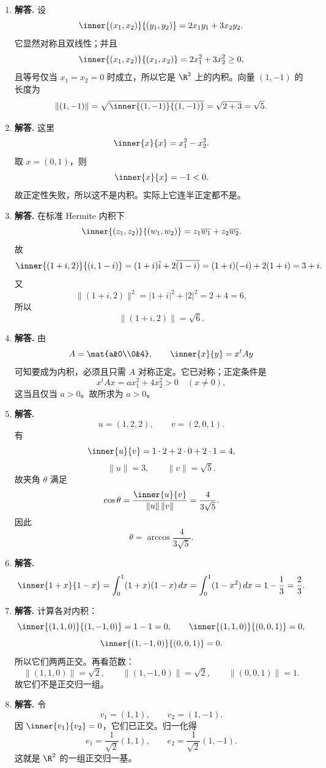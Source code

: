 \begin{enumerate}[label=\textbf{\arabic*.}, leftmargin=*, itemsep=1em]
\item \textbf{解答.} 设
\[
\inner{(x_1,x_2)}{(y_1,y_2)}=2x_1y_1+3x_2y_2.
\]
它显然对称且双线性；并且
\[
\inner{(x_1,x_2)}{(x_1,x_2)}=2x_1^2+3x_2^2\ge 0,
\]
且等号仅当 $x_1=x_2=0$ 时成立，所以它是 $\R^2$ 上的内积。向量 $(1,-1)$ 的长度为
\[
\|(1,-1)\|=\sqrt{\inner{(1,-1)}{(1,-1)}}=\sqrt{2+3}=\sqrt{5}.
\]

\item \textbf{解答.} 这里
\[
\inner{x}{x}=x_1^2-x_2^2.
\]
取 $x=(0,1)$，则
\[
\inner{x}{x}=-1<0.
\]
故正定性失败，所以这不是内积。实际上它连半正定都不是。

\item \textbf{解答.} 在标准 Hermite 内积下
\[
\inner{(z_1,z_2)}{(w_1,w_2)}=z_1\overline{w_1}+z_2\overline{w_2}.
\]
故
\[
\inner{(1+i,2)}{(i,1-i)}
=(1+i)\overline{i}+2\overline{(1-i)}
=(1+i)(-i)+2(1+i)=3+i.
\]
又
\[
\|(1+i,2)\|^2=|1+i|^2+|2|^2=2+4=6,
\]
所以
\[
\|(1+i,2)\|=\sqrt{6}.
\]

\item \textbf{解答.} 由
\[
A=\mat{a&0\\0&4},\qquad \inner{x}{y}=x^tAy
\]
可知要成为内积，必须且只需 $A$ 对称正定。它已对称；正定条件是
\[
x^tAx=ax_1^2+4x_2^2>0\quad (x\ne 0),
\]
这当且仅当 $a>0$。故所求为 $a>0$。

\item \textbf{解答.}
\[
u=(1,2,2),\qquad v=(2,0,1).
\]
有
\[
\inner{u}{v}=1\cdot2+2\cdot0+2\cdot1=4,
\]
\[
\|u\|=3,\qquad \|v\|=\sqrt{5}.
\]
故夹角 $\theta$ 满足
\[
\cos\theta=\frac{\inner{u}{v}}{\|u\|\,\|v\|}=\frac{4}{3\sqrt5}.
\]
因此
\[
\theta=\arccos\frac{4}{3\sqrt5}.
\]

\item \textbf{解答.}
\[
\inner{1+x}{1-x}=\int_0^1(1+x)(1-x)\,dx=\int_0^1(1-x^2)\,dx=1-\frac13=\frac23.
\]

\item \textbf{解答.} 计算各对内积：
\[
\inner{(1,1,0)}{(1,-1,0)}=1-1=0,\qquad
\inner{(1,1,0)}{(0,0,1)}=0,
\]
\[
\inner{(1,-1,0)}{(0,0,1)}=0.
\]
所以它们两两正交。再看范数：
\[
\|(1,1,0)\|=\sqrt2,\qquad \|(1,-1,0)\|=\sqrt2,\qquad \|(0,0,1)\|=1.
\]
故它们不是正交归一组。

\item \textbf{解答.} 令
\[
v_1=(1,1),\qquad v_2=(1,-1).
\]
因 $\inner{v_1}{v_2}=0$，它们已正交。归一化得
\[
e_1=\frac1{\sqrt2}(1,1),\qquad e_2=\frac1{\sqrt2}(1,-1).
\]
这就是 $\R^2$ 的一组正交归一基。


\end{enumerate}
